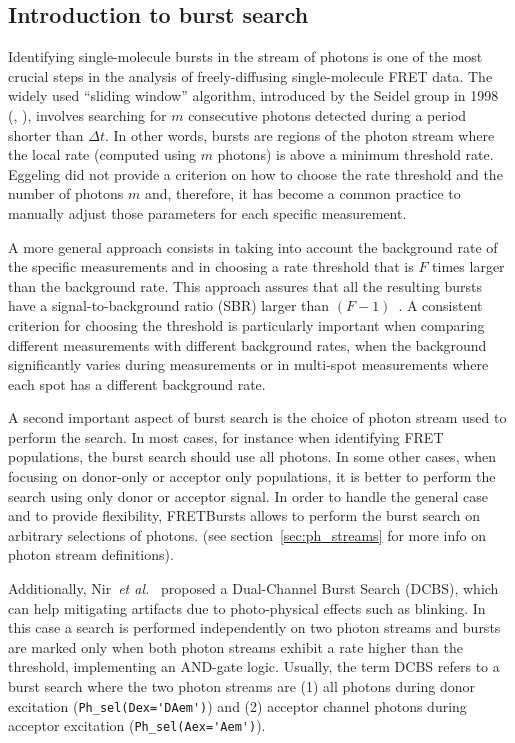 \subsection{Introduction to burst search}
\label{sec:burstsearch_intro}

Identifying single-molecule bursts in the stream of photons is
one of the most crucial steps in the analysis of freely-diffusing single-molecule FRET data.
The widely used ``sliding window'' algorithm, introduced by the Seidel group in 1998
(\cite{Eggeling_1998}, \cite{Fries_1998}), involves searching for
$m$ consecutive photons detected during a period shorter than
$\Delta t$. In other words, bursts are regions of the photon stream where the
local rate (computed using $m$ photons) is above a minimum threshold rate. 
Eggeling did not provide a criterion on how to choose the rate
threshold and the number of photons $m$ and, therefore, it has become a common
practice to manually adjust those parameters for each specific measurement.

A more general approach consists in taking into account the background rate of
the specific measurements and in choosing a rate threshold that is $F$ times
larger than the background rate. This approach assures that all the resulting bursts
have a signal-to-background ratio (SBR) larger than
$(F-1)$~\cite{Michalet_2012}. A consistent criterion for choosing the threshold is
particularly important when comparing different measurements with different background
rates, when the background significantly varies during measurements or in
multi-spot measurements where each spot has a different background rate.

A second important aspect of burst search is the choice of photon stream used
to perform the search.
In most cases, for instance when identifying FRET populations,
the burst search should use all photons. In some other cases, when focusing on
donor-only or acceptor only populations, it is better to perform the search using
only donor or acceptor signal.
In order to handle the general case and to provide flexibility,
FRETBursts allows to perform the burst search on arbitrary selections of photons.
(see section~\ref{sec:ph_streams} for more info on photon stream definitions).

Additionally, Nir~\textit{et al.}~\cite{Nir_2006} proposed a Dual-Channel Burst
Search (DCBS), which can help mitigating artifacts due to
photo-physical effects such as blinking. In this case a search is performed
independently on two photon streams and bursts are marked only when both photon
streams exhibit a rate higher than the threshold,
implementing an AND-gate logic.
Usually, the term DCBS refers to a burst search where the two photon streams
are (1) all photons
during donor excitation (\verb|Ph_sel(Dex='DAem')|) and (2) acceptor channel photons
during acceptor
excitation (\verb|Ph_sel(Aex='Aem')|).

